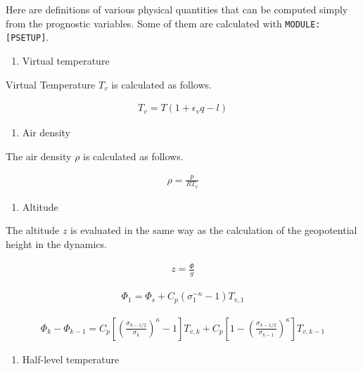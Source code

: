 Here are definitions of various physical quantities that can be computed
simply from the prognostic variables. Some of them are calculated with
\texttt{MODULE:{[}PSETUP{]}}.

\begin{enumerate}
\def\labelenumi{\arabic{enumi}.}
\tightlist
\item
  Virtual temperature
\end{enumerate}

Virtual Temperature \(T_v\) is calculated as follows.

\begin{eqnarray}
  T_v = T ( 1 + \epsilon_v q - l )
\end{eqnarray}

\begin{enumerate}
\def\labelenumi{\arabic{enumi}.}
\setcounter{enumi}{1}
\tightlist
\item
  Air density
\end{enumerate}

The air density \(\rho\) is calculated as follows.

\begin{eqnarray}
  \rho = \frac{p}{RT_v}
\end{eqnarray}

\begin{enumerate}
\def\labelenumi{\arabic{enumi}.}
\setcounter{enumi}{2}
\tightlist
\item
  Altitude
\end{enumerate}

The altitude \(z\) is evaluated in the same way as the calculation of
the geopotential height in the dynamics.

\begin{eqnarray}
  z = \frac{\Phi}{g}
\end{eqnarray}

\begin{eqnarray}
 \Phi_{1}  =  \Phi_{s} + C_{p} ( \sigma_{1}^{-\kappa} - 1  ) T_{v,1}
\end{eqnarray}

\begin{eqnarray}
 \Phi_k - \Phi_{k-1}
   =  C_{p}
   \left[ \left( \frac{ \sigma_{k-1/2} }{ \sigma_k } \right)^{\kappa}
          - 1 \right] T_{v,k}
       + C_{p}
   \left[ 1-
         \left( \frac{ \sigma_{k-1/2} }{ \sigma_{k-1} } \right)^{\kappa}
              \right] T_{v,k-1}
\end{eqnarray}

\begin{enumerate}
\def\labelenumi{\arabic{enumi}.}
\setcounter{enumi}{3}
\tightlist
\item
  Half-level temperature
\end{enumerate}

